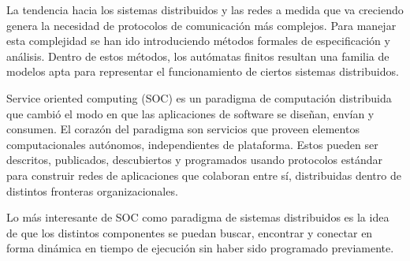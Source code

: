 La tendencia hacia los sistemas distribuidos y las redes a medida que va creciendo genera la necesidad de protocolos de comunicación más complejos. Para manejar esta complejidad se han ido introduciendo métodos formales de especificación y análisis. Dentro de estos métodos, los autómatas finitos resultan una familia de modelos apta para representar el funcionamiento de ciertos sistemas distribuidos.

Service oriented computing (SOC) es un paradigma de computación distribuida que cambió el modo en que las aplicaciones de software se diseñan, envían y consumen. El corazón del paradigma son servicios que proveen elementos computacionales autónomos, independientes de plataforma. Estos pueden ser descritos, publicados, descubiertos y programados usando protocolos estándar para construir redes de aplicaciones que colaboran entre sí, distribuidas dentro de distintos fronteras organizacionales.

Lo más interesante de SOC como paradigma de sistemas distribuidos es la idea de que los distintos componentes se puedan buscar, encontrar y conectar en forma dinámica en tiempo de ejecución sin haber sido programado previamente. 
 